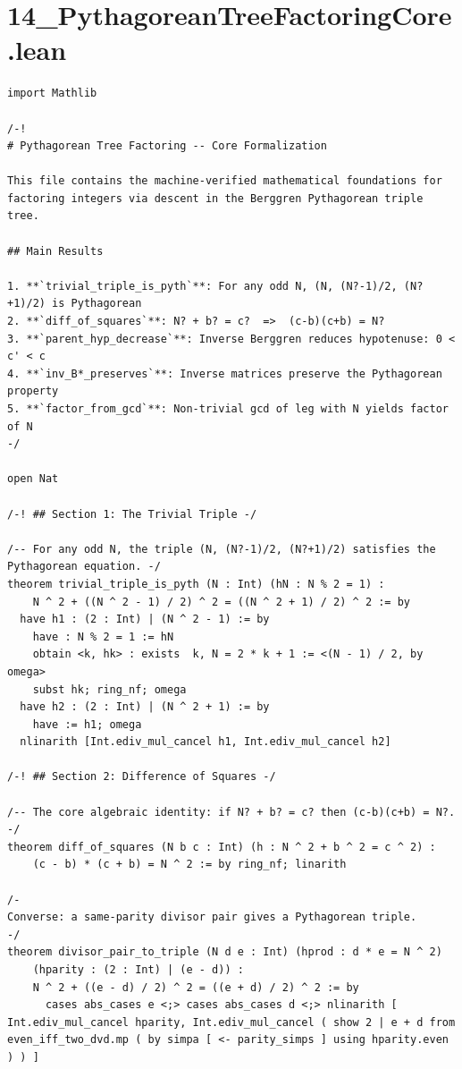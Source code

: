 \documentclass[11pt,twoside,openright]{book}
\theoremstyle{definition}
\theoremstyle{remark}
\begin{document}
\clearpage

\section*{14\_PythagoreanTreeFactoringCore.lean}

\begin{lstlisting}[style=lean]
import Mathlib

/-!
# Pythagorean Tree Factoring -- Core Formalization

This file contains the machine-verified mathematical foundations for
factoring integers via descent in the Berggren Pythagorean triple tree.

## Main Results

1. **`trivial_triple_is_pyth`**: For any odd N, (N, (N?-1)/2, (N?+1)/2) is Pythagorean
2. **`diff_of_squares`**: N? + b? = c?  =>  (c-b)(c+b) = N?
3. **`parent_hyp_decrease`**: Inverse Berggren reduces hypotenuse: 0 < c' < c
4. **`inv_B*_preserves`**: Inverse matrices preserve the Pythagorean property
5. **`factor_from_gcd`**: Non-trivial gcd of leg with N yields factor of N
-/

open Nat

/-! ## Section 1: The Trivial Triple -/

/-- For any odd N, the triple (N, (N?-1)/2, (N?+1)/2) satisfies the Pythagorean equation. -/
theorem trivial_triple_is_pyth (N : Int) (hN : N % 2 = 1) :
    N ^ 2 + ((N ^ 2 - 1) / 2) ^ 2 = ((N ^ 2 + 1) / 2) ^ 2 := by
  have h1 : (2 : Int) | (N ^ 2 - 1) := by
    have : N % 2 = 1 := hN
    obtain <k, hk> : exists  k, N = 2 * k + 1 := <(N - 1) / 2, by omega>
    subst hk; ring_nf; omega
  have h2 : (2 : Int) | (N ^ 2 + 1) := by
    have := h1; omega
  nlinarith [Int.ediv_mul_cancel h1, Int.ediv_mul_cancel h2]

/-! ## Section 2: Difference of Squares -/

/-- The core algebraic identity: if N? + b? = c? then (c-b)(c+b) = N?. -/
theorem diff_of_squares (N b c : Int) (h : N ^ 2 + b ^ 2 = c ^ 2) :
    (c - b) * (c + b) = N ^ 2 := by ring_nf; linarith

/-
Converse: a same-parity divisor pair gives a Pythagorean triple.
-/
theorem divisor_pair_to_triple (N d e : Int) (hprod : d * e = N ^ 2)
    (hparity : (2 : Int) | (e - d)) :
    N ^ 2 + ((e - d) / 2) ^ 2 = ((e + d) / 2) ^ 2 := by
      cases abs_cases e <;> cases abs_cases d <;> nlinarith [ Int.ediv_mul_cancel hparity, Int.ediv_mul_cancel ( show 2 | e + d from even_iff_two_dvd.mp ( by simpa [ <- parity_simps ] using hparity.even ) ) ]


\end{lstlisting}
\end{document}
